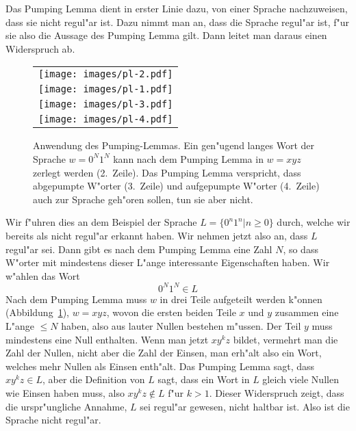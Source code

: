 Das Pumping Lemma dient in erster Linie dazu, von einer Sprache
nachzuweisen, dass sie nicht regul"ar ist. Dazu nimmt man an, dass
die Sprache regul"ar ist, f"ur sie also die Aussage des Pumping Lemma
gilt. Dann leitet man daraus einen Widerspruch ab.

\begin{figure}
\begin{center}
\begin{tabular}{l}
\texttt{[image: images/pl-2.pdf]}\\
\texttt{[image: images/pl-1.pdf]}\\
\texttt{[image: images/pl-3.pdf]}\\
\texttt{[image: images/pl-4.pdf]}
\end{tabular}
\end{center}
\caption{Anwendung des Pumping-Lemmas. Ein gen"ugend langes Wort
der Sprache $w=0^N1^N$ kann nach dem Pumping Lemma in $w=xyz$ 
zerlegt werden (2.~Zeile). Das Pumping Lemma verspricht, dass
abgepumpte W"orter (3.~Zeile) und aufgepumpte W"orter (4.~Zeile)
auch zur Sprache geh"oren sollen, tun sie aber nicht.
\label{plimage}}
\end{figure}

\begin{beispiel}
Wir f"uhren dies an dem Beispiel der Sprache $L=\{0^n1^n|n\ge 0\}$
durch, welche wir bereits als nicht regul"ar erkannt haben. Wir nehmen
jetzt also an, dass $L$ regul"ar sei. Dann gibt es nach dem Pumping
Lemma eine Zahl $N$, so dass W"orter mit mindestens dieser L"ange
interessante Eigenschaften haben. Wir w"ahlen das Wort
\[
0^N1^N\in L
\]
Nach dem Pumping Lemma muss $w$ in drei Teile aufgeteilt werden k"onnen
(Abbildung~\ref{plimage}),
$w=xyz$,
wovon die ersten beiden Teile $x$ und $y$ zusammen eine L"ange $\le N$
haben, also aus lauter Nullen bestehen m"ussen. Der Teil $y$ muss
mindestens eine Null enthalten. Wenn man jetzt $xy^kz$ bildet, vermehrt
man die Zahl der Nullen, nicht aber die Zahl der Einsen, man erh"alt
also ein Wort, welches mehr Nullen als Einsen enth"alt. Das Pumping
Lemma sagt, dass $xy^kz\in L$, aber die Definition von $L$ sagt,
dass ein Wort in $L$ gleich viele Nullen wie Einsen haben muss, also
$xy^kz\not\in L$ f"ur $k>1$. Dieser Widerspruch zeigt, dass die urspr"ungliche
Annahme, $L$ sei regul"ar gewesen, nicht haltbar ist. Also ist
die Sprache nicht regul"ar.
\end{beispiel}

